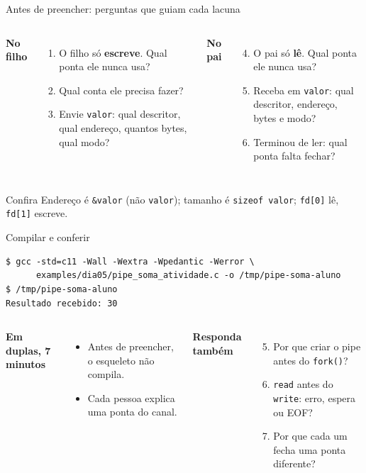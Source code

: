\documentclass[aspectratio=169]{beamer}
\begin{document}
\begin{frame}{Antes de preencher: perguntas que guiam cada lacuna}
\begin{columns}[T]
\textbf{No filho}
\begin{enumerate}
    \item O filho só \textbf{escreve}. Qual ponta ele nunca usa?
    \item Qual conta ele precisa fazer?
    \item Envie \texttt{valor}: qual descritor, qual endereço, quantos bytes, qual modo?
\end{enumerate}

\textbf{No pai}
\begin{enumerate}
    \setcounter{enumi}{3}
    \item O pai só \textbf{lê}. Qual ponta ele nunca usa?
    \item Receba em \texttt{valor}: qual descritor, endereço, bytes e modo?
    \item Terminou de ler: qual ponta falta fechar?
\end{enumerate}
\end{columns}

\vspace{0.6em}
\begin{alertblock}{Confira}
Endereço é \texttt{\&valor} (não \texttt{valor}); tamanho é \texttt{sizeof valor}; \texttt{fd[0]} lê, \texttt{fd[1]} escreve.
\end{alertblock}
\end{frame}

\begin{frame}[fragile]{Compilar e conferir}
\begin{lstlisting}[style=terminal]
$ gcc -std=c11 -Wall -Wextra -Wpedantic -Werror \
      examples/dia05/pipe_soma_atividade.c -o /tmp/pipe-soma-aluno
$ /tmp/pipe-soma-aluno
Resultado recebido: 30
\end{lstlisting}

\begin{columns}[T]
\textbf{Em duplas, 7 minutos}
\begin{itemize}
    \item Antes de preencher, o esqueleto não compila.
    \item Cada pessoa explica uma ponta do canal.
\end{itemize}

\textbf{Responda também}
\begin{enumerate}
    \setcounter{enumi}{4}
    \item Por que criar o pipe antes do \texttt{fork()}?
    \item \texttt{read} antes do \texttt{write}: erro, espera ou EOF?
    \item Por que cada um fecha uma ponta diferente?
\end{enumerate}
\end{columns}
\end{frame}
\end{document}
